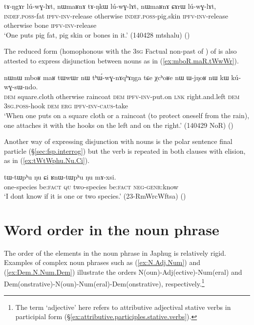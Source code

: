  \begin{exe}
\ex \label{ex:luwɣlAt.nWmaRnA}
 \gll  tɤ-ŋgɤr lú-wɣ-lɤt, nɯmaʁnɤ tɤ-ŋkɯ lú-wɣ-lɤt, nɯmaʁnɤ ɕɤrɯ lú-wɣ-lɤt, \\
 \textsc{indef}.\textsc{poss}-fat \textsc{ipfv}-\textsc{inv}-release otherwise  \textsc{indef}.\textsc{poss}-pig.skin  \textsc{ipfv}-\textsc{inv}-release otherwise bone \textsc{ipfv}-\textsc{inv}-release \\
\glt `One puts pig fat, pig skin or bones in it.' (140428 mtshalu) 	()
 \end{exe}

The reduced form  (homophonous with the \textsc{3sg} Factual non-past of ) of   is also attested to express disjunction between nouns as in (\ref{ex:mboR.maR.tWwWr}).

 \begin{exe}
\ex \label{ex:mboR.maR.tWwWr}
 \gll  nɯnɯ mboʁ maʁ tɯwɯr nɯ tʰɯ́-wɣ-nɤqʰɤŋga tɕe χcʰoʁe nɯ ɯ-jŋoʁ nɯ kɯ kú-wɣ-sɯ-ndo. \\
 \textsc{dem} square.cloth otherwise raincoat \textsc{dem} \textsc{ipfv}-\textsc{inv}-put.on \textsc{lnk} right.and.left \textsc{dem} \textsc{3sg}.\textsc{poss}-hook \textsc{dem} \textsc{erg} \textsc{ipfv}-\textsc{inv}-\textsc{caus}-take \\
 \glt `When one puts on a square cloth or a raincoat (to protect oneself from the rain), one attaches it with the hooks on the left and on the right.' (140429 NoR)
()
  \end{exe}

Another way of expressing disjunction with nouns is the polar sentence final particle  (§\ref{sec:fsp.interrog}) but the verb is repeated in both clauses with elision, as in (\ref{ex:tWtWphu.Nu.Ci}).

 \begin{exe}
\ex \label{ex:tWtWphu.Nu.Ci}
 \gll tɯ-tɯpʰu ŋu ɕi ʁnɯ-tɯpʰu ŋu mɤ-xsi. \\
 one-species be:\textsc{fact} \textsc{qu} two-species be:\textsc{fact}  \textsc{neg}-\textsc{genr}:know \\
\glt `I dont know if it is one or two species.' (23-RmWrcWftsa) 	()
 \end{exe}
 
\section{Word order in the noun phrase} \label{sec:noun.phrases.word.order}
The  order of the elements in the noun phrase in Japhug is relatively rigid.  Examples of complex noun phrases such as (\ref{ex:N.Adj.Num}) and (\ref{ex:Dem.N.Num.Dem}) illustrate the orders N(oun)-Adj(ective)-Num(eral) and Dem(onstrative)-N(oun)-Num(eral)-Dem(onstrative), respectively.\footnote{The term `adjective' here refers to attributive adjectival stative verbs in participial form (§\ref{ex:attributive.participles.stative.verbs}). } 

